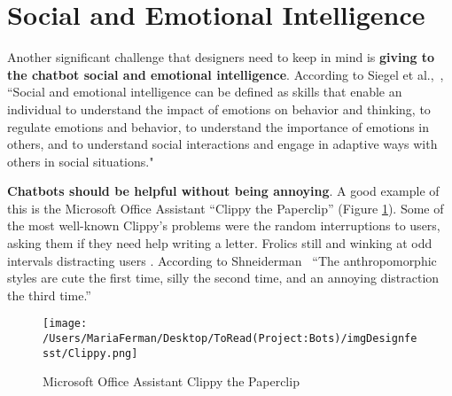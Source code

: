 \documentclass[a4paper,10pt]{article}
\begin{document}

\section{Social and Emotional Intelligence}

Another significant challenge that designers need to keep in mind is \textbf{giving to the chatbot social and emotional intelligence}. According to Siegel et al.,~\cite{siegel2012pocket}, ``Social and emotional intelligence can be defined as skills that enable an individual to understand the impact of emotions on behavior and thinking, to regulate emotions and behavior, to understand the importance of emotions in others, and to understand social interactions and engage in adaptive ways with others in social situations."

\textbf{Chatbots should be helpful without being annoying}. A good example of this is the Microsoft Office Assistant ``Clippy the Paperclip” (Figure \ref{FigureClippy}). Some of the most well-known Clippy's problems were the random interruptions to users, asking them if they need help writing a letter. Frolics still and winking at odd intervals distracting users \cite{Clippy2015}. According to Shneiderman~\cite{shneiderman1995looking} ``The anthropomorphic styles are cute the first time, silly the second time, and an annoying distraction the third time.”

\begin{figure}
\centering
\texttt{[image: /Users/MariaFerman/Desktop/ToRead(Project:Bots)/imgDesignfesst/Clippy.png]}
\caption{Microsoft Office Assistant Clippy the Paperclip}
\label{FigureClippy}
\end{figure}
\end{document}
